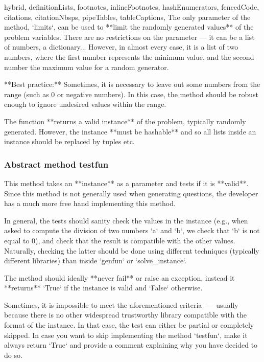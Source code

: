 \documentclass[
  digital, %
  table,   %
  twoside, %
  nolof,     %
  nolot,     %
  draft=false,
  final,
]{fithesis3}
\begin{document}
\begin{markdown*}{%
  hybrid,
  definitionLists,
  footnotes,
  inlineFootnotes,
  hashEnumerators,
  fencedCode,
  citations,
  citationNbsps,
  pipeTables,
  tableCaptions,
}
The only parameter of the method, `limits`, can be used to **limit the randomly
generated values** of the problem variables. There are no restrictions on the
parameter --- it can be a list of numbers, a dictionary... However, in almost 
every case, it is a list of two numbers, where the first number represents the 
minimum value, and the second number the maximum value for a random generator.

\begin{shaded}{**Best practice:**}
    Sometimes, it is necessary to leave out some numbers from the range (such as 0 or negative numbers).
In this case, the method should be robust enough to ignore undesired values within the range.
\end{shaded}

The function **returns a valid instance** of the problem, typically randomly generated.
However, the instance **must be hashable** and so all lists inside an instance should be replaced by tuples etc.


\subsubsection{Abstract method testfun} 

This method takes an **instance** as a parameter and tests if it is **valid**. Since this method is not generally used when generating questions, the developer has a much more free hand implementing this method.

In general, the tests should sanity check the values in the instance (e.g., when asked to compute the division of two numbers `a` and `b`, we check that `b` is not equal to 0), and check that the result is compatible with the other values. Naturally, checking the latter should be done using different techniques (typically different libraries) than inside `genfun` or `solve_instance`.

The method should ideally **never fail** or raise an exception, instead it **returns**
`True` if the instance is valid and `False` otherwise.

Sometimes, it is impossible to meet the aforementioned criteria~---~usually because there is no other widespread trustworthy library compatible with the format of the instance. In that case, the test can either be partial or completely skipped. In case you want to skip implementing the method `testfun`, make it always return `True` and provide a comment explaining why you have decided to do so.


\end{markdown*}
\end{document}
